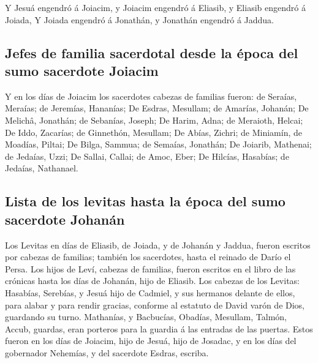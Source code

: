  Y Jesuá engendró á Joiacim, y Joiacim engendró á
Eliasib, y Eliasib engendró á Joiada,  Y Joiada engendró
á Jonathán, y Jonathán engendró á Jaddua.

\hypertarget{jefes-de-familia-sacerdotal-desde-la-uxe9poca-del-sumo-sacerdote-joiacim}{%
\subsection{Jefes de familia sacerdotal desde la época del sumo
sacerdote
Joiacim}\label{jefes-de-familia-sacerdotal-desde-la-uxe9poca-del-sumo-sacerdote-joiacim}}

 Y en los días de Joiacim los sacerdotes cabezas de
familias fueron: de Seraías, Meraías; de Jeremías, Hananías;
 De Esdras, Mesullam; de Amarías, Johanán;
 De Melichâ, Jonathán; de Sebanías, Joseph;
 De Harim, Adna; de Meraioth, Helcai;  De
Iddo, Zacarías; de Ginnethón, Mesullam;  De Abías,
Zichri; de Miniamín, de Moadías, Piltai;  De Bilga,
Sammua; de Semaías, Jonathán;  De Joiarib, Mathenai; de
Jedaías, Uzzi;  De Sallai, Callai; de Amoc, Eber;
 De Hilcías, Hasabías; de Jedaías, Nathanael.

\hypertarget{lista-de-los-levitas-hasta-la-uxe9poca-del-sumo-sacerdote-johanuxe1n}{%
\subsection{Lista de los levitas hasta la época del sumo sacerdote
Johanán}\label{lista-de-los-levitas-hasta-la-uxe9poca-del-sumo-sacerdote-johanuxe1n}}

 Los Levitas en días de Eliasib, de Joiada, y de Johanán
y Jaddua, fueron escritos por cabezas de familias; también los
sacerdotes, hasta el reinado de Darío el Persa.  Los
hijos de Leví, cabezas de familias, fueron escritos en el libro de las
crónicas hasta los días de Johanán, hijo de Eliasib.  Los
cabezas de los Levitas: Hasabías, Serebías, y Jesuá hijo de Cadmiel, y
sus hermanos delante de ellos, para alabar y para rendir gracias,
conforme al estatuto de David varón de Dios, guardando su turno.
 Mathanías, y Bacbucías, Obadías, Mesullam, Talmón,
Accub, guardas, eran porteros para la guardia á las entradas de las
puertas.  Estos fueron en los días de Joiacim, hijo de
Jesuá, hijo de Josadac, y en los días del gobernador Nehemías, y del
sacerdote Esdras, escriba.

